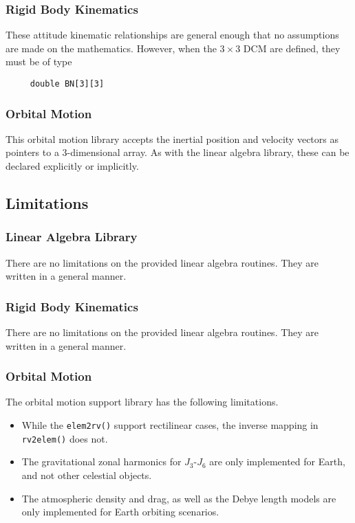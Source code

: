 \subsubsection{Rigid Body Kinematics}
These attitude kinematic relationships are general enough that no assumptions are made on the mathematics.  However, when the $3\times 3$ DCM are defined, they must be of type
\begin{verbatim}
     double BN[3][3]
\end{verbatim}


\subsubsection{Orbital Motion}
This orbital motion library accepts the inertial position and velocity vectors as pointers to a 3-dimensional array.  As with the linear algebra library, these can be declared explicitly or implicitly.    


\subsection{Limitations}
\subsubsection{Linear Algebra Library}
There are no limitations on the provided linear algebra routines.  They are written in a general manner. 

\subsubsection{Rigid Body Kinematics}
There are no limitations on the provided linear algebra routines.  They are written in a general manner.  

\subsubsection{Orbital Motion}
The orbital motion support library has the following limitations.
\begin{itemize}
	\item While the {\tt elem2rv()} support rectilinear cases, the inverse mapping in {\tt rv2elem()} does not.
	\item The gravitational zonal harmonics for $J_{3}$-$J_{6}$ are only implemented for Earth, and not other celestial objects.
	\item The atmospheric density and drag, as well as the Debye length models are only implemented for Earth orbiting scenarios. 
\end{itemize}













